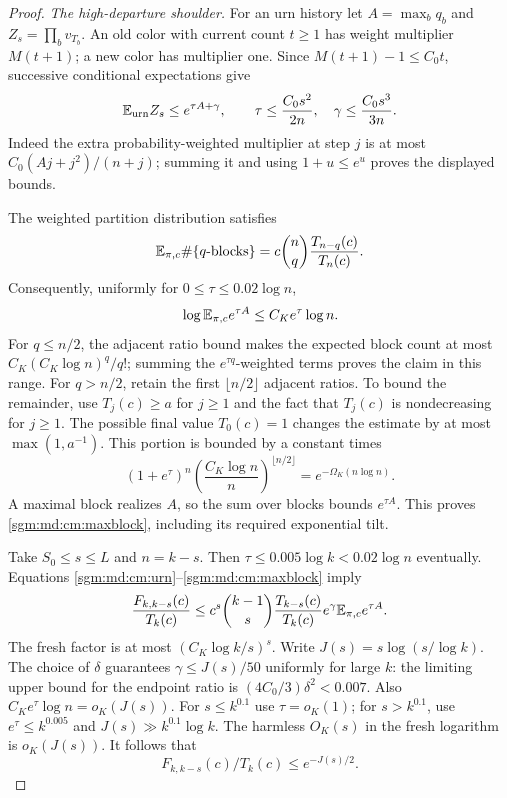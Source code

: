\documentclass[11pt,letterpaper]{article}
\theoremstyle{remark}\newtheorem{remark}[theorem]{Remark}
\theoremstyle{definition}\newtheorem{definition}[theorem]{Definition}
\begin{document}
\begin{proof}
\emph{The high-departure shoulder.}
For an urn history let \(A=\max_bq_b\) and
\(Z_s=\prod_bv_{T_b}\).
An old color with current count \(t\ge1\) has weight multiplier
\(M(t+1)\); a new color has multiplier one.
Since \(M(t+1)-1\le C_0t\), successive conditional expectations give
\begin{equation}\label{sgm:md:cm:unmarked-urn}
 \mathbb E_{\rm urn}Z_s\le e^{\tau A+\gamma},\qquad
 \tau\le\frac{C_0s^2}{2n},\quad
 \gamma\le\frac{C_0s^3}{3n}.
\end{equation}
Indeed the extra probability-weighted multiplier at step \(j\)
is at most \(C_0(Aj+j^2)/(n+j)\); summing it and using
\(1+u\le e^u\) proves the displayed bounds.

The weighted partition distribution satisfies
\[
 \mathbb E_{\pi,c}\#\{q\hbox{-blocks}\}
 =c\binom nq\frac{T_{n-q}(c)}{T_n(c)}.
\]
Consequently, uniformly for \(0\le\tau\le0.02\log n\),
\begin{equation}\label{sgm:md:cm:maxblock}
 \log\mathbb E_{\pi,c}e^{\tau A}\le C_Ke^\tau\log n.
\end{equation}
For \(q\le n/2\), the adjacent ratio bound makes the expected
block count at most \(C_K(C_K\log n)^q/q!\); summing the
\(e^{\tau q}\)-weighted terms proves the claim in this range.
For \(q>n/2\), retain the first \(\lfloor n/2\rfloor\) adjacent
ratios. To bound the remainder, use \(T_j(c)\ge a\) for \(j\ge1\)
and the fact that \(T_j(c)\) is nondecreasing for \(j\ge1\).
The possible final value \(T_0(c)=1\) changes the estimate by at
most \(\max(1,a^{-1})\). This portion is bounded by a constant times
\[
 (1+e^\tau)^n
       \left(\frac{C_K\log n}{n}\right)^{\lfloor n/2\rfloor}
 =e^{-\Omega_K(n\log n)}.
\]
A maximal block realizes \(A\), so the sum over blocks bounds
\(e^{\tau A}\). This proves \eqref{sgm:md:cm:maxblock}, including its
required exponential tilt.

Take \(S_0\le s\le L\) and \(n=k-s\).
Then \(\tau\le0.005\log k<0.02\log n\) eventually.
Equations \eqref{sgm:md:cm:urn}--\eqref{sgm:md:cm:maxblock} imply
\[
 \frac{F_{k,k-s}(c)}{T_k(c)}
 \le c^s\binom{k-1}{s}
       \frac{T_{k-s}(c)}{T_k(c)}
       e^\gamma\mathbb E_{\pi,c}e^{\tau A}.
\]
The fresh factor is at most \((C_K\log k/s)^s\).
Write \(J(s)=s\log(s/\log k)\).
The choice of \(\delta\) guarantees
\(\gamma\le J(s)/50\) uniformly for large \(k\):
the limiting upper bound for the endpoint ratio is
\((4C_0/3)\delta^2<0.007\).
Also \(C_Ke^\tau\log n=o_K(J(s))\).
For \(s\le k^{0.1}\) use \(\tau=o_K(1)\);
for \(s>k^{0.1}\), use \(e^\tau\le k^{0.005}\) and
\(J(s)\gg k^{0.1}\log k\).
The harmless \(O_K(s)\) in the fresh logarithm is \(o_K(J(s))\).
It follows that
\begin{equation}\label{sgm:md:cm:shoulder}
 F_{k,k-s}(c)/T_k(c)\le e^{-J(s)/2}.
\end{equation}


\end{proof}
\end{document}
